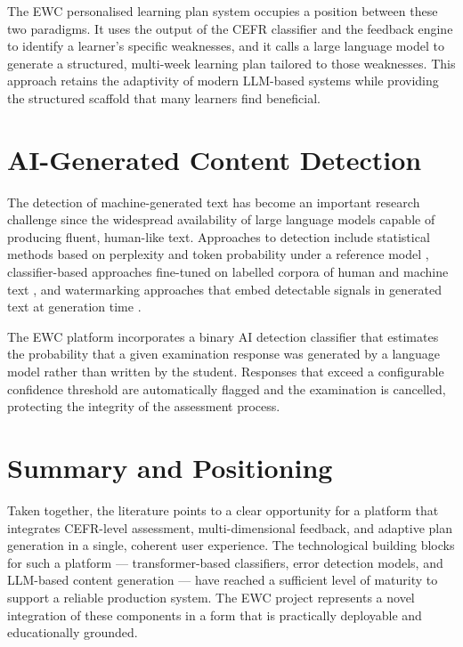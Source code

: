 \documentclass[12pt, a4paper]{report}
\begin{document}
The EWC personalised learning plan system occupies a position between these two paradigms. It uses the output of the CEFR classifier and the feedback engine to identify a learner's specific weaknesses, and it calls a large language model to generate a structured, multi-week learning plan tailored to those weaknesses. This approach retains the adaptivity of modern LLM-based systems while providing the structured scaffold that many learners find beneficial.

\section{AI-Generated Content Detection}

The detection of machine-generated text has become an important research challenge since the widespread availability of large language models capable of producing fluent, human-like text. Approaches to detection include statistical methods based on perplexity and token probability under a reference model \cite{solaiman2019}, classifier-based approaches fine-tuned on labelled corpora of human and machine text \cite{mitchell2023}, and watermarking approaches that embed detectable signals in generated text at generation time \cite{kirchenbauer2023}.

The EWC platform incorporates a binary AI detection classifier that estimates the probability that a given examination response was generated by a language model rather than written by the student. Responses that exceed a configurable confidence threshold are automatically flagged and the examination is cancelled, protecting the integrity of the assessment process.

\section{Summary and Positioning}

Taken together, the literature points to a clear opportunity for a platform that integrates CEFR-level assessment, multi-dimensional feedback, and adaptive plan generation in a single, coherent user experience. The technological building blocks for such a platform — transformer-based classifiers, error detection models, and LLM-based content generation — have reached a sufficient level of maturity to support a reliable production system. The EWC project represents a novel integration of these components in a form that is practically deployable and educationally grounded.
\end{document}
